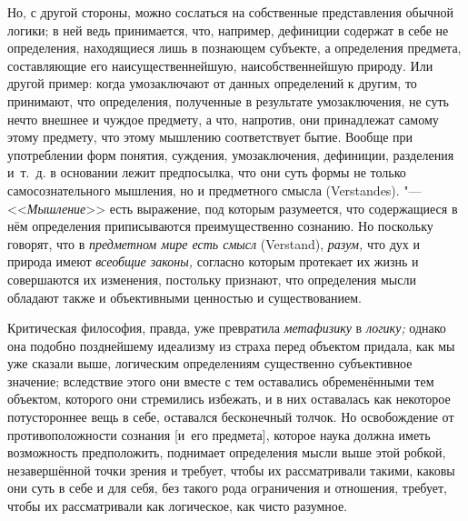 Но, с другой стороны, можно сослаться на собственные представления обычной
логики; в ней ведь принимается, что, например, дефиниции содержат в себе не
определения, находящиеся лишь в познающем субъекте, а определения предмета,
составляющие его наисущественнейшую, наисобственнейшую природу. Или другой
пример: когда умозаключают от данных определений к другим, то принимают,
что определения, полученные в результате умозаключения, не суть нечто
внешнее и чуждое предмету, а что, напротив, они принадлежат самому этому
предмету, что этому мышлению соответствует бытие. Вообще при употреблении
форм понятия, суждения, умозаключения, дефиниции, разделения и~т.~д. в
основании лежит предпосылка, что они суть формы не только самосознательного
мышления, но и предметного смысла (Verstandes). "---
<<{\em Мышление}>> есть выражение, под которым
разумеется, что содержащиеся в нём определения приписываются
преимущественно сознанию. Но поскольку говорят, что в
{\em предметном мире есть смысл} (Verstand),
{\em разум,} что дух и природа имеют
{\em всеобщие законы,} согласно которым протекает их
жизнь и совершаются их изменения, постольку признают, что определения мысли
обладают также и объективными ценностью и существованием.

Критическая философия, правда, уже превратила
{\em метафизику} в {\em логику;}
однако она подобно позднейшему
идеализму
из страха перед объектом придала, как мы уже сказали выше, логическим
определениям существенно субъективное значение; вследствие этого они вместе
с тем оставались обременёнными тем объектом, которого они стремились
избежать, и в них оставалась как некоторое потустороннее вещь в себе,
оставался бесконечный толчок. Но освобождение от противоположности сознания
[и~его предмета], которое наука должна иметь возможность предположить,
поднимает определения мысли выше этой робкой, незавершённой точки зрения и
требует, чтобы их рассматривали такими, каковы они суть в себе и для себя,
без такого рода ограничения и отношения, требует, чтобы их рассматривали
как логическое, как чисто разумное.

